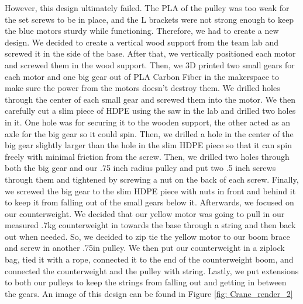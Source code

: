 \documentclass[letterpaper, 12pt]{article}
\begin{document}
However, this design ultimately failed.  The PLA of the pulley was too weak for the set screws to be in place, and the L brackets were not strong enough to keep the blue motors sturdy while functioning.  Therefore, we had to create a new design.  We decided to create a vertical wood support from the team lab and screwed it in the side of the base.  After that, we vertically positioned each motor and screwed them in the wood support.   Then, we 3D printed two small gears for each motor and one big gear out of PLA Carbon Fiber in the makerspace to make sure the power from the motors doesn’t destroy them.  We drilled holes through the center of each small gear and screwed them into the motor.  We then carefully cut a slim piece of HDPE using the saw in the lab and drilled two holes in it.  One hole was for securing it to the wooden support, the other acted as an axle for the big gear so it could spin.  Then, we drilled a hole in the center of the big gear slightly larger than the hole in the slim HDPE piece so that it can spin freely with minimal friction from the screw.  Then, we drilled two holes through both the big gear and our .75 inch radius pulley and put two .5 inch screws through them and tightened by screwing a nut on the back of each screw.  Finally, we screwed the big gear to the slim HDPE piece with nuts in front and behind it to keep it from falling out of the small gears below it.   Afterwards, we focused on our counterweight.  We decided that our yellow motor was going to pull in our measured .7kg counterweight in towards the base through a string and then back out when needed.  So, we decided to zip tie the yellow motor to our boom brace and screw in another .75in pulley.  We then put our counterweight in a ziplock bag, tied it with a rope, connected it to the end of the counterweight boom,  and connected the counterweight and the pulley with string.  Lastly, we put extensions to both our pulleys to keep the strings from falling out and getting in between the gears. An image of this design can be found in Figure \ref{fig: Crane_render_2}
\end{document}
